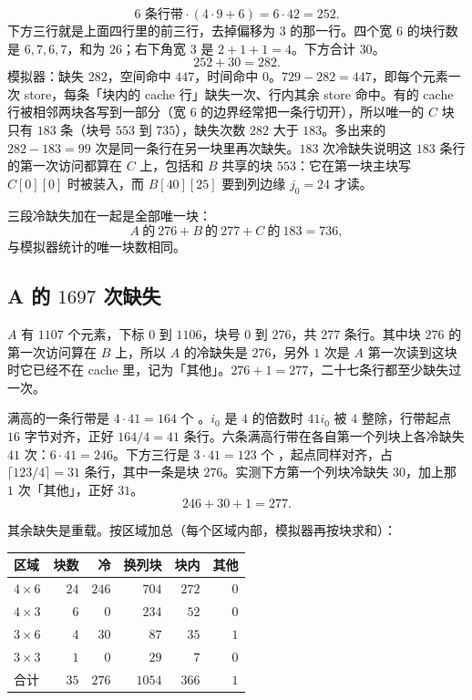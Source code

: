 \[
6\text{ 条行带}\cdot(4\cdot9+6)=6\cdot42=252.
\]
下方三行就是上面四行里的前三行，去掉偏移为 $3$ 的那一行。四个宽 $6$ 的块行数是 $6,7,6,7$，和为 $26$；右下角宽 $3$ 是 $2+1+1=4$。下方合计 $30$。
\[
252+30=282.
\]
模拟器：缺失 $282$，空间命中 $447$，时间命中 $0$。$729-282=447$，即每个元素一次 store，每条「块内的 cache 行」缺失一次、行内其余 store 命中。有的 cache 行被相邻两块各写到一部分（宽 $6$ 的边界经常把一条行切开），所以唯一的 $C$ 块只有 $183$ 条（块号 $553$ 到 $735$），缺失次数 $282$ 大于 $183$。多出来的 $282-183=99$ 次是同一条行在另一块里再次缺失。$183$ 次冷缺失说明这 $183$ 条行的第一次访问都算在 $C$ 上，包括和 $B$ 共享的块 $553$：它在第一块主块写 $C[0][0]$ 时被装入，而 $B[40][25]$ 要到列边缘 $j_0=24$ 才读。

三段冷缺失加在一起是全部唯一块：
\[
A\ 的\ 276 + B\ 的\ 277 + C\ 的\ 183 = 736,
\]
与模拟器统计的唯一块数相同。

\subsection{A 的 \texorpdfstring{$1697$}{1697} 次缺失}

$A$ 有 $1107$ 个元素，下标 $0$ 到 $1106$，块号 $0$ 到 $276$，共 $277$ 条行。其中块 $276$ 的第一次访问算在 $B$ 上，所以 $A$ 的冷缺失是 $276$，另外 $1$ 次是 $A$ 第一次读到这块时它已经不在 cache 里，记为「其他」。$276+1=277$，二十七条行都至少缺失过一次。

满高的一条行带是 $4\cdot41=164$ 个 。$i_0$ 是 $4$ 的倍数时 $41i_0$ 被 $4$ 整除，行带起点 $16$ 字节对齐，正好 $164/4=41$ 条行。六条满高行带在各自第一个列块上各冷缺失 $41$ 次：$6\cdot41=246$。下方三行是 $3\cdot41=123$ 个 ，起点同样对齐，占 $\lceil123/4\rceil=31$ 条行，其中一条是块 $276$。实测下方第一个列块冷缺失 $30$，加上那 $1$ 次「其他」，正好 $31$。
\[
246+30+1=277.
\]

其余缺失是重载。按区域加总（每个区域内部，模拟器再按块求和）：

\begin{center}
\label{tab:c3a}
\small
\begin{tabular}{@{}lrrrrr@{}}
\toprule
区域 & 块数 & 冷 & 换列块 & 块内 & 其他\\
\midrule
$4\times6$ & $24$ & $246$ & $704$ & $272$ & $0$\\
$4\times3$ & $6$ & $0$ & $234$ & $52$ & $0$\\
$3\times6$ & $4$ & $30$ & $87$ & $35$ & $1$\\
$3\times3$ & $1$ & $0$ & $29$ & $7$ & $0$\\
\midrule
合计 & $35$ & $276$ & $1054$ & $366$ & $1$\\
\bottomrule
\end{tabular}
\end{center}

